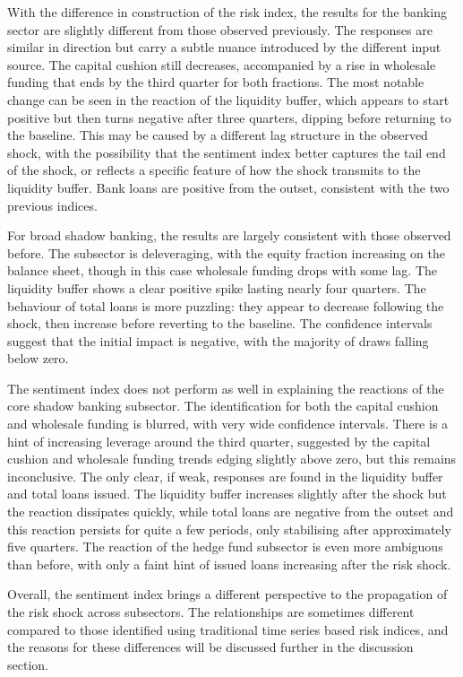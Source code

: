 \documentclass[12pt,a4paper]{report}\usepackage[a4paper, top=2.5cm, bottom=2.5cm, left=2.5cm, right=2.5cm]{geometry}
\begin{document}
With the difference in construction of the risk index, the results for the banking sector are slightly different from those observed previously. The responses are similar in direction but carry a subtle nuance introduced by the different input source. The capital cushion still decreases, accompanied by a rise in wholesale funding that ends by the third quarter for both fractions. The most notable change can be seen in the reaction of the liquidity buffer, which appears to start positive but then turns negative after three quarters, dipping before returning to the baseline. This may be caused by a different lag structure in the observed shock, with the possibility that the sentiment index better captures the tail end of the shock, or reflects a specific feature of how the shock transmits to the liquidity buffer. Bank loans are positive from the outset, consistent with the two previous indices.

For broad shadow banking, the results are largely consistent with those observed before. The subsector is deleveraging, with the equity fraction increasing on the balance sheet, though in this case wholesale funding drops with some lag. The liquidity buffer shows a clear positive spike lasting nearly four quarters. The behaviour of total loans is more puzzling: they appear to decrease following the shock, then increase before reverting to the baseline. The confidence intervals suggest that the initial impact is negative, with the majority of draws falling below zero.

The sentiment index does not perform as well in explaining the reactions of the core shadow banking subsector. The identification for both the capital cushion and wholesale funding is blurred, with very wide confidence intervals. There is a hint of increasing leverage around the third quarter, suggested by the capital cushion and wholesale funding trends edging slightly above zero, but this remains inconclusive. The only clear, if weak, responses are found in the liquidity buffer and total loans issued. The liquidity buffer increases slightly after the shock but the reaction dissipates quickly, while total loans are negative from the outset and this reaction persists for quite a few periods, only stabilising after approximately five quarters.
The reaction of the hedge fund subsector is even more ambiguous than before, with only a faint hint of issued loans increasing after the risk shock.

Overall, the sentiment index brings a different perspective to the propagation of the risk shock across subsectors. The relationships are sometimes different compared to those identified using traditional time series based risk indices, and the reasons for these differences will be discussed further in the discussion section.
\end{document}
